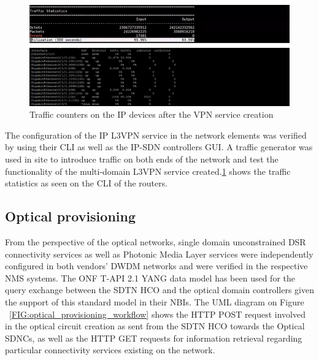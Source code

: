 \documentclass[a4paper,fleqn]{cas-dc}
\begin{document}
\begin{figure}
	\centering
		\includegraphics[width=\linewidth]{figs/counters.png}
	\caption{Traffic counters on the IP devices after the VPN service creation}
	\label{FIG:counters}
\end{figure}

The configuration of the IP L3VPN service in the network elements was verified by using their CLI as well as the IP-SDN controllers GUI. A traffic generator was used in site to introduce traffic on both ends of the network and test the functionality of the multi-domain L3VPN service created.\ref{FIG:counters} shows the traffic statistics as seen on the CLI of the routers.

\subsection{Optical provisioning}
From the perspective of the optical networks, single domain unconstrained DSR connectivity services as well as Photonic Media Layer services were independently configured in both vendors’ DWDM networks and were verified in the respective NMS systems. The ONF T-API 2.1 YANG data model has been used for the query exchange between the SDTN HCO and the optical domain controllers given the support of this standard model in their NBIs. The UML diagram on Figure ~\ref{FIG:optical_provisioning_workflow} shows the HTTP POST request involved in the optical circuit creation as sent from the SDTN HCO towards the Optical SDNCs, as well as the HTTP GET requests for information retrieval regarding particular connectivity services existing on the network. 
\end{document}
